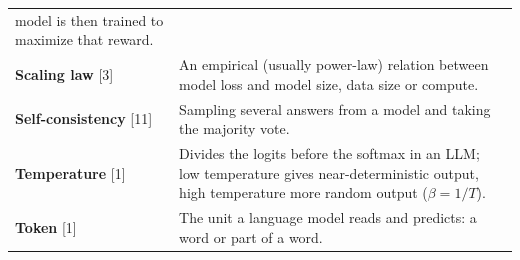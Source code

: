 \begin{longtable}[]{@{}
  >{\raggedright\arraybackslash}p{}
  >{\raggedright\arraybackslash}p{}@{}}
model is then trained to maximize that reward. \\
\textbf{Scaling law} {[}3{]} & An empirical (usually power-law) relation
between model loss and model size, data size or compute. \\
\textbf{Self-consistency} {[}11{]} & Sampling several answers from a
model and taking the majority vote. \\
\textbf{Temperature} {[}1{]} & Divides the logits before the softmax in
an LLM; low temperature gives near-deterministic output, high
temperature more random output (\(\beta = 1/T\)). \\
\textbf{Token} {[}1{]} & The unit a language model reads and predicts: a
word or part of a word. \\
\end{longtable}
